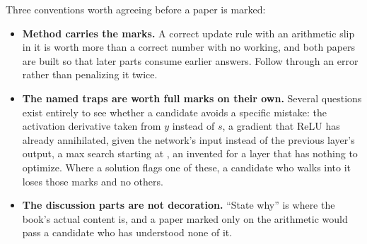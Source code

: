 Three conventions worth agreeing before a paper is marked:
\begin{itemize}
  \item \textbf{Method carries the marks.} A correct update rule with an arithmetic slip in it is
    worth more than a correct number with no working, and both papers are built so that later parts
    consume earlier answers. Follow through an error rather than penalizing it twice.
  \item \textbf{The named traps are worth full marks on their own.} Several questions exist entirely
    to see whether a candidate avoids a specific mistake: the activation derivative taken from $y$
    instead of $s$, a gradient that ReLU has already annihilated,  given the
    network's input instead of the previous layer's output, a max search starting at , an
     invented for a layer that has nothing to optimize. Where a solution flags one
    of these, a candidate who walks into it loses those marks and no others.
  \item \textbf{The discussion parts are not decoration.} ``State why'' is where the book's actual
    content is, and a paper marked only on the arithmetic would pass a candidate who has understood
    none of it.
\end{itemize}
